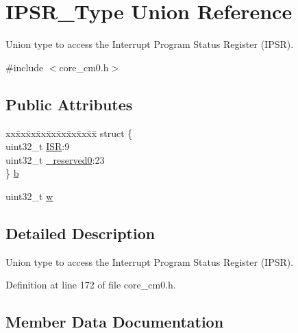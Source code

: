 \hypertarget{union_i_p_s_r___type}{}\section{I\+P\+S\+R\+\_\+\+Type Union Reference}
\label{union_i_p_s_r___type}


Union type to access the Interrupt Program Status Register (I\+P\+SR).  




{\ttfamily \#include $<$core\+\_\+cm0.\+h$>$}

\subsection*{Public Attributes}
\begin{DoxyCompactItemize}
\item 
\begin{tabbing}
xx\=xx\=xx\=xx\=xx\=xx\=xx\=xx\=xx\=\kill
struct \{\\
\>uint32\_t \hyperlink{union_i_p_s_r___type_ab46e5f1b2f4d17cfb9aca4fffcbb2fa5}{ISR}:9\\
\>uint32\_t \hyperlink{union_i_p_s_r___type_ad2eb0a06de4f03f58874a727716aa9aa}{\_reserved0}:23\\
\} \hyperlink{union_i_p_s_r___type_add0d6497bd50c25569ea22b48a03ec50}{b}\\

\end{tabbing}\item 
uint32\+\_\+t \hyperlink{union_i_p_s_r___type_a4adca999d3a0bc1ae682d73ea7cfa879}{w}
\end{DoxyCompactItemize}


\subsection{Detailed Description}
Union type to access the Interrupt Program Status Register (I\+P\+SR). 

Definition at line 172 of file core\+\_\+cm0.\+h.



\subsection{Member Data Documentation}
